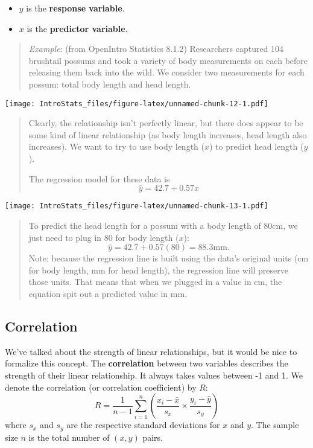 \documentclass[
]{book}
\providecommand{\tightlist}{%
  \setlength{\itemsep}{0pt}\setlength{\parskip}{0pt}}
\begin{document}
\begin{itemize}
\tightlist
\item
  \(y\) is the \textbf{response variable}.
\item
  \(x\) is the \textbf{predictor variable}.
\end{itemize}

\begin{quote}
\emph{Example}: (from OpenIntro Statistics 8.1.2) Researchers captured 104 brushtail possums and took a variety of body measurements on each before releasing them back into the wild. We consider two measurements for each possum: total body length and head length.
\end{quote}

\texttt{[image: IntroStats\_files/figure-latex/unnamed-chunk-12-1.pdf]}

\begin{quote}
Clearly, the relationship isn't perfectly linear, but there does appear to be some kind of linear relationship (as body length increases, head length also increases). We want to try to use body length (\(x\)) to predict head length (\(y\)).

The regression model for these data is \[\hat{y}=42.7 + 0.57x\]
\end{quote}

\texttt{[image: IntroStats\_files/figure-latex/unnamed-chunk-13-1.pdf]}

\begin{quote}
To predict the head length for a possum with a body length of 80cm, we just need to plug in 80 for body length (\(x\)): \[\hat{y}=42.7 + 0.57(80) = 88.3\text{mm}.\] Note: because the regression line is built using the data's original units (cm for body length, mm for head length), the regression line will preserve those units. That means that when we plugged in a value in cm, the equation spit out a predicted value in mm.
\end{quote}

\hypertarget{correlation}{%
\subsection{Correlation}\label{correlation}}

We've talked about the strength of linear relationships, but it would be nice to formalize this concept. The \textbf{correlation} between two variables describes the strength of their linear relationship. It always takes values between -1 and 1. We denote the correlation (or correlation coefficient) by \(R\): \[R = \frac{1}{n-1}\sum_{i=1}^n\left(\frac{x_i - \bar{x}}{s_x}\times\frac{y_i - \bar{y}}{s_y}\right)\] where \(s_x\) and \(s_y\) are the respective standard deviations for \(x\) and \(y\). The sample size \(n\) is the total number of \((x,y)\) pairs.
\end{document}

